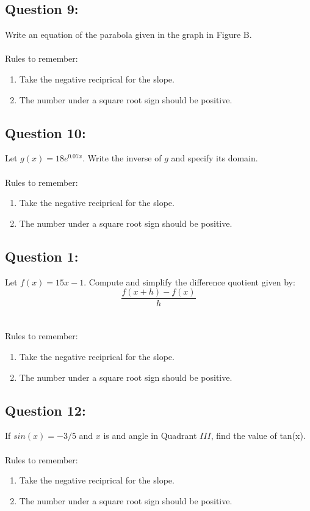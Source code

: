 \documentclass[12pt, letterpaper]{article}
\begin{document}
\subsection{Question 9:}
  Write an equation of the parabola given in the graph in Figure B. 
  \\\\
  Rules to remember:
  \begin{enumerate}
    \item Take the negative reciprical for the slope.
    \item The number under a square root sign should be positive.
  \end{enumerate}

\subsection{Question 10:}
  Let $g(x)=18e^{0.07x}$. Write the inverse of $g$ and specify its domain.
  \\\\
  Rules to remember:
  \begin{enumerate}
    \item Take the negative reciprical for the slope.
    \item The number under a square root sign should be positive.
  \end{enumerate}

\subsection{Question 1:}
  Let $f(x)=15x-1$. Compute and simplify the difference quotient given by:
  $$\frac{f(x+h)-f(x)}{h}$$
  \\\\
  Rules to remember:
  \begin{enumerate}
    \item Take the negative reciprical for the slope.

    \item The number under a square root sign should be positive.
  \end{enumerate}

\subsection{Question 12:}
  If $sin(x) = -3/5$ and $x$ is and angle in Quadrant $III$, 
  find the value of tan(x). 
  \\\\
  Rules to remember:
  \begin{enumerate}
    \item Take the negative reciprical for the slope.
    \item The number under a square root sign should be positive.
  \end{enumerate}
\end{document}
